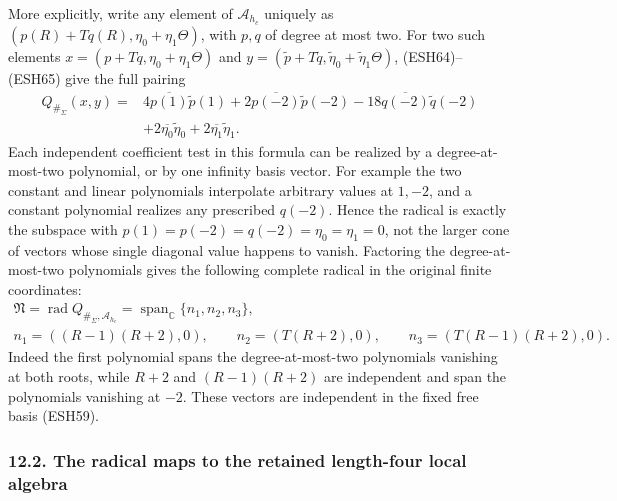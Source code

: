 \documentclass[
  10pt,
  a4paper,
]{article}
\begin{document}
More explicitly, write any element of \(\mathcal A_{h_c}\) uniquely as
\((p(R)+Tq(R),\eta_0+\eta_1\Theta)\), with \(p,q\) of degree at most
two. For two such elements \(x=(p+Tq,\eta_0+\eta_1\Theta)\) and
\(y=(\widetilde p+T\widetilde q,\widetilde\eta_0+\widetilde\eta_1\Theta)\),
(ESH64)--(ESH65) give the full pairing \[
\begin{aligned}
Q_{\#_\Sigma}(x,y)
={}&4\overline{p(1)}\widetilde p(1)
+2\overline{p(-2)}\widetilde p(-2)
-18\overline{q(-2)}\widetilde q(-2)\\
&+2\overline{\eta_0}\widetilde\eta_0
+2\overline{\eta_1}\widetilde\eta_1.
\end{aligned}
\tag{ESH67}
\] Each independent coefficient test in this formula can be realized by
a degree-at-most-two polynomial, or by one infinity basis vector. For
example the two constant and linear polynomials interpolate arbitrary
values at \(1,-2\), and a constant polynomial realizes any prescribed
\(q(-2)\). Hence the radical is exactly the subspace with
\(p(1)=p(-2)=q(-2)=\eta_0=\eta_1=0\), not the larger cone of vectors
whose single diagonal value happens to vanish. Factoring the
degree-at-most-two polynomials gives the following complete radical in
the original finite coordinates: \[
\begin{gathered}
\mathfrak N=\operatorname{rad}Q_{\#_\Sigma,\mathcal A_{h_c}}
=\operatorname{span}_{\mathbb C}\{n_1,n_2,n_3\},\\
n_1=((R-1)(R+2),0),\qquad
n_2=(T(R+2),0),\qquad
n_3=(T(R-1)(R+2),0).
\end{gathered}
\tag{ESH68}
\] Indeed the first polynomial spans the degree-at-most-two polynomials
vanishing at both roots, while \(R+2\) and \((R-1)(R+2)\) are
independent and span the polynomials vanishing at \(-2\). These vectors
are independent in the fixed free basis (ESH59).

\subsubsection{12.2. The radical maps to the retained length-four local
algebra}\label{the-radical-maps-to-the-retained-length-four-local-algebra}
\end{document}
